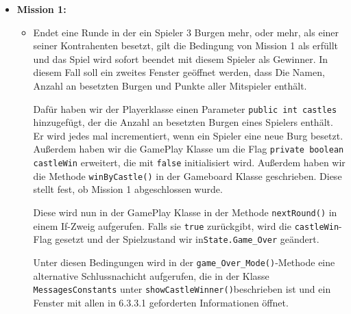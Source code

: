 \begin{itemize}

\item \textbf{Mission 1:}
	\begin{itemize}
	\item[]
		Endet eine Runde in der ein Spieler 3 Burgen mehr, oder mehr, als einer seiner Kontrahenten besetzt, gilt die Bedingung von Mission 1 als erfüllt und das Spiel wird sofort beendet mit diesem Spieler als Gewinner. In diesem Fall soll 	
		ein zweites Fenster ge\"offnet werden, dass Die Namen, Anzahl an besetzten Burgen und Punkte aller Mitspieler enthält.

		Dafür haben wir der Playerklasse einen Parameter \texttt{public int castles} hinzugefügt, der die Anzahl an besetzten Burgen eines Spielers enthält. Er wird jedes mal incrementiert, wenn ein Spieler eine neue Burg besetzt. Außerdem 
		haben wir die GamePlay Klasse um die Flag \texttt{private boolean castleWin} erweitert, die mit \texttt{false} initialisiert wird.
		Außerdem haben wir die Methode \texttt{winByCastle()} in der Gameboard Klasse geschrieben. Diese stellt fest, ob Mission 1 abgeschlossen wurde.
		
		Diese wird nun in der GamePlay Klasse in der Methode \texttt{nextRound()} in einem If-Zweig aufgerufen. Falls sie \texttt{true} zurückgibt, wird die \texttt{castleWin}-Flag gesetzt und der Spielzustand wir in\texttt{State.Game\_Over} 
		geändert.

		Unter diesen Bedingungen wird in der \texttt{game\_Over\_Mode()}-Methode eine alternative Schlussnachicht aufgerufen, die in der Klasse \texttt{MessagesConstants} unter \texttt {showCastleWinner()}beschrieben ist und ein Fenster mit 
		allen in 6.3.3.1 geforderten Informationen \"offnet.
	\end{itemize}



\end{itemize}

